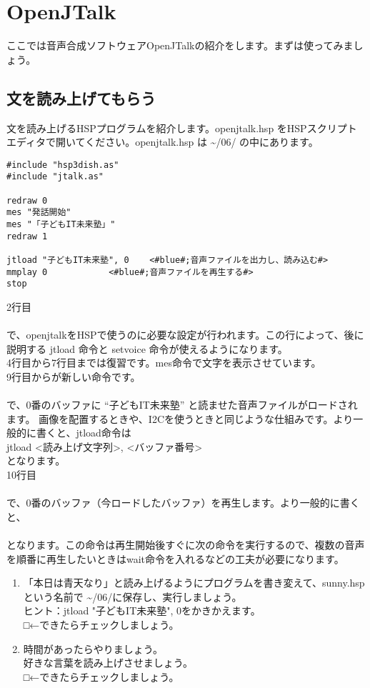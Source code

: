 \section{OpenJTalk}
ここでは音声合成ソフトウェアOpenJTalkの紹介をします。まずは使ってみましょう。
\subsection{文を読み上げてもらう}
文を読み上げるHSPプログラムを紹介します。openjtalk.hsp をHSPスクリプトエディタで開いてください。openjtalk.hsp は  \textasciitilde /06/ の中にあります。\\

\begin{lstlisting}[caption=openjtalk.hsp,label=openjtalk.hsp]
#include "hsp3dish.as"
#include "jtalk.as"

redraw 0
mes "発話開始"
mes "「子どもIT未来塾」"
redraw 1

jtload "子どもIT未来塾", 0	<#blue#;音声ファイルを出力し、読み込む#>
mmplay 0			<#blue#;音声ファイルを再生する#>
stop
\end{lstlisting}

2行目\\
\\
で、openjtalkをHSPで使うのに必要な設定が行われます。この行によって、後に説明する jtload 命令と setvoice 命令が使えるようになります。\\
4行目から7行目までは復習です。mes命令で文字を表示させています。\\
9行目からが新しい命令です。\\
\\
で、0番のバッファに “子どもIT未来塾” と読ませた音声ファイルがロードされます。 画像を配置するときや、I2Cを使うときと同じような仕組みです。より一般的に書くと、jtload命令は\\
jtload <読み上げ文字列>, <バッファ番号>\\
となります。\\
10行目\\
\\
で、0番のバッファ（今ロードしたバッファ）を再生します。より一般的に書くと、\\
\\
となります。この命令は再生開始後すぐに次の命令を実行するので、複数の音声を順番に再生したいときはwait命令を入れるなどの工夫が必要になります。\\

\begin{tcolorbox}[title=\useOmetoi]
\begin{enumerate}
\item 「本日は青天なり」と読み上げるようにプログラムを書き変えて、sunny.hspという名前で \textasciitilde /06/に保存し、実行しましょう。\\ヒント：jtload "子どもIT未来塾", 0をかきかえます。\\□←できたらチェックしましょう。
\item 時間があったらやりましょう。\\好きな言葉を読み上げさせましょう。\\□←できたらチェックしましょう。
\end{enumerate}
\end{tcolorbox}
